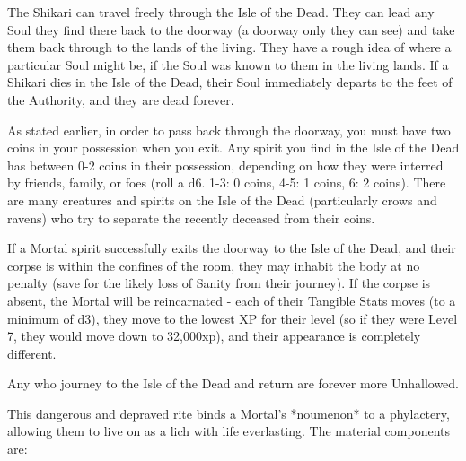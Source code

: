 {The Shikari can travel freely through the Isle of the Dead.  They can lead any Soul they find there back to the doorway (a doorway only they can see) and take them back through to the lands of the living.  They have a rough idea of where a particular Soul might be, if the Soul was known to them in the living lands. If a Shikari dies in the Isle of the Dead, their Soul immediately departs to the feet of the Authority, and they are dead forever.  

As stated earlier, in order to pass back through the doorway, you must have two coins in your possession when you exit.  Any spirit you find in the Isle of the Dead has between 0-2 coins in their possession, depending on how they were interred by friends, family, or foes (roll a d6.  1-3: 0 coins, 4-5: 1 coins, 6: 2 coins).  There are many creatures and spirits on the Isle of the Dead (particularly crows and ravens) who try to separate the recently deceased from their coins.

If a Mortal spirit successfully exits the doorway to the Isle of the Dead, and their corpse is within the confines of the room, they may inhabit the body at no penalty (save for the likely loss of Sanity from their journey).  If the corpse is absent, the Mortal will be reincarnated - each of their Tangible Stats moves \DCDOWN (to a minimum of d3), they move to the lowest XP for their level (so if they were Level 7, they would move down to 32,000xp), and their appearance is completely different. 

Any who journey to the Isle of the Dead and return are forever more Unhallowed. 

\newpage

\OCCULT[
  Name=Lichdom,
  Link=occultism-lichdom,
  Success=13,
  Cost=10000\AU,
  Widdershins=5
]

This dangerous and depraved rite binds a Mortal's *noumenon* to a phylactery, allowing them to live on as a lich with life everlasting.  The material components are:



}

